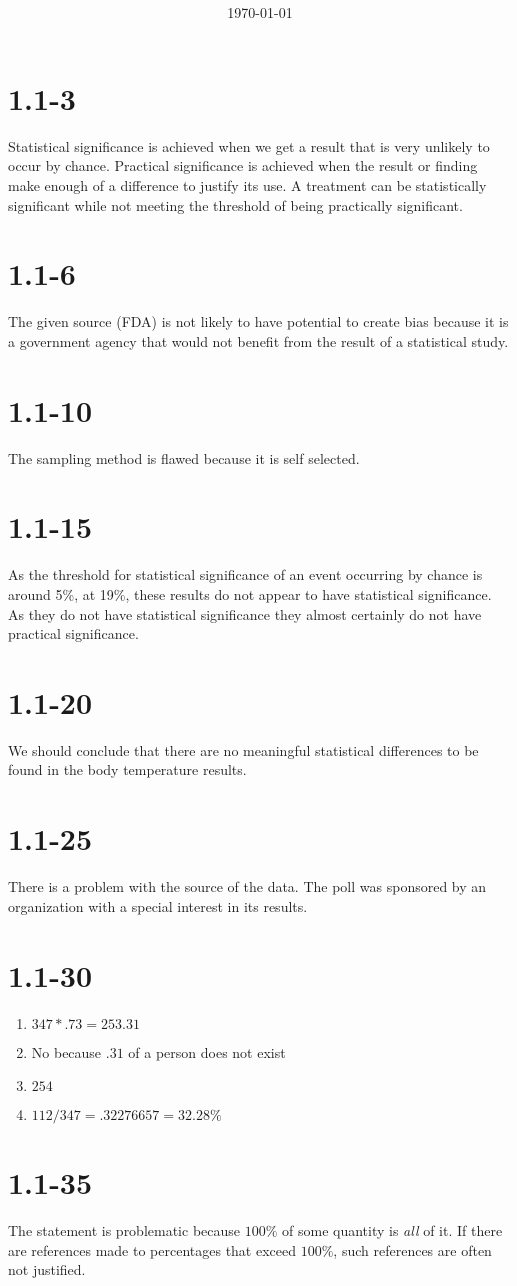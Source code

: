 \documentclass{article}
\title{\classdescription\ \\ \classname\ \\ $\ $ \\ \assignment}
\author{\authorname}
\date{\today}
\newcommand{\chapter}{1.1}
\newcommand{\problem}[1]{\vspace{5ex}\section*{\chapter-#1}}
\begin{document}
\maketitle

\problem{3}
Statistical significance is achieved when we get a result that is very unlikely to occur by chance. Practical significance is achieved when the result or finding make enough of a difference to justify its use. A treatment can be statistically significant while not meeting the threshold of being practically significant.


\problem{6}
The given source (FDA) is not likely to have potential to create bias because it is a government agency that would not benefit from the result of a statistical study.


\problem{10}
The sampling method is flawed because it is self selected.


\problem{15}
As the threshold for statistical significance of an event occurring by chance is around 5\%, at 19\%, these results do not appear to have statistical significance. As they do not have statistical significance they almost certainly do not have practical significance.


\problem{20}
We should conclude that there are no meaningful statistical differences to be found in the body temperature results.


\problem{25}
There is a problem with the source of the data. The poll was sponsored by an organization with a special interest in its results.


\problem{30}
\begin{enumerate}[label=\textbf{\alph*.}]
\item $347 * .73 = 253.31$
\item No because $.31$ of a person does not exist
\item $254$
  \item $112 / 347 = .32276657 = 32.28\%$
\end{enumerate}


\problem{35}
The statement is problematic because $100\%$ of some quantity is \textit{all} of it. If there are references made to percentages that exceed $100\%$, such references are often not justified.
\end{document}
